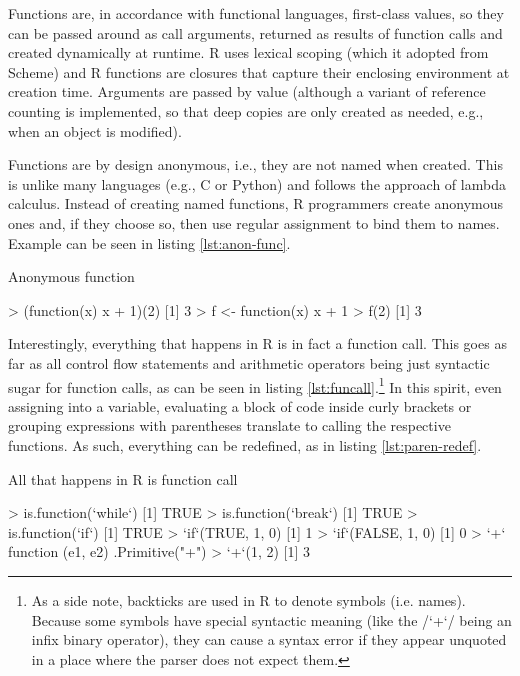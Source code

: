 Functions are, in accordance with functional languages, first-class values, so they can be passed around as call arguments, returned as results of function calls and created dynamically at runtime. R uses lexical scoping (which it adopted from Scheme) and R functions are closures that capture their enclosing environment at creation time. Arguments are passed by value (although a variant of reference counting is implemented, so that deep copies are only created as needed, e.g., when an object is modified).

Functions are by design anonymous, i.e., they are not named when created. This is unlike many languages (e.g., C or Python) and follows the approach of lambda calculus. Instead of creating named functions, R programmers create anonymous ones and, if they choose so, then use regular assignment to bind them to names. Example can be seen in listing \ref{lst:anon-func}.

\begin{listing}[htbp]
  \caption{\label{lst:anon-func}Anonymous function}
  \begin{rcode}
> (function(x) x + 1)(2)
[1] 3
> f <- function(x) x + 1
> f(2)
[1] 3
  \end{rcode}
\end{listing}

Interestingly, everything that happens in R is in fact a function call. This goes as far as all control flow statements and arithmetic operators being just syntactic sugar for function calls, as can be seen in listing \ref{lst:funcall}.\footnote{As a side note, backticks are used in R to denote symbols (i.e. names). Because some symbols have special syntactic meaning (like the \rinline/`+`/ being an infix binary operator), they can cause a syntax error if they appear unquoted in a place where the parser does not expect them.} In this spirit, even assigning into a variable, evaluating a block of code inside curly brackets or grouping expressions with parentheses translate to calling the respective functions. As such, everything can be redefined, as in listing \ref{lst:paren-redef}.

\begin{listing}[htbp]
  \caption{\label{lst:funcall}All that happens in R is function call}
  \begin{rcode}
> is.function(`while`)
[1] TRUE
> is.function(`break`)
[1] TRUE
> is.function(`if`)
[1] TRUE
> `if`(TRUE, 1, 0)
[1] 1
> `if`(FALSE, 1, 0)
[1] 0
> `+`
function (e1, e2)  .Primitive("+")
> `+`(1, 2)
[1] 3
  \end{rcode}
\end{listing}

